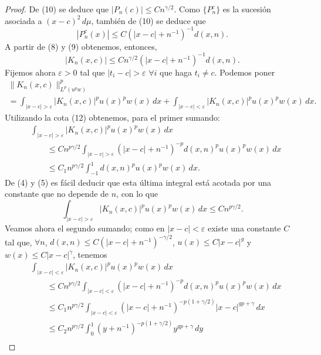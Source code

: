 \documentclass[a4paper,12pt]{article}
\theoremstyle{plain}
\theoremstyle{definition}
\begin{document}
\begin{proof}
De (10) se deduce que $| P_{n}(c) | \leq C n^{\gamma/2}$.
Como $\{P_{n}^{c}\}$ es la sucesi\'on
asociada a $(x-c)^{2}\,d\mu$, tambi\'{e}n de (10) se deduce que
$$
| P_{n}^{c}(x) | \leq C ( | x - c | + n^{-1})^{-1} d(x,n).
$$
A partir de (8) y (9) obtenemos, entonces,
\begin{equation}
| K_{n}(x,c) | \leq C n^{\gamma/2} ( | x - c | + n^{-1})^{-1} d(x,n).
\tag{12}
\end{equation}
Fijemos ahora $\varepsilon > 0$ tal que $| t_{i} - c | > \varepsilon$
$\forall i$ que haga $t_{i} \neq c$.
Podemos poner
\begin{multline*}
\| K_{n}(x,c) \|^{p}_{L^{p}(u^{p}w)} \\
= \int_{| x - c | > \varepsilon} | K_{n}(x,c) |^{p} u(x)^{p} w(x)\,dx
+ \int_{| x - c | < \varepsilon} | K_{n}(x,c) |^{p} u(x)^{p} w(x)\,dx.
\end{multline*}
Utilizando la cota (12) obtenemos, para el primer sumando:
\begin{align*}
&\int_{| x - c | > \varepsilon} | K_{n}(x,c) |^{p} u(x)^{p} w(x)\,dx \\
&\qquad\leq C n^{p \gamma/2} \int_{| x - c | > \varepsilon}
( | x - c | + n^{-1})^{-p} d(x,n)^{p} u(x)^{p} w(x)\,dx \\
&\qquad\leq C_{1} n^{p \gamma/2} \int_{-1}^{1} d(x,n)^{p} u(x)^{p} w(x)\,dx.
\end{align*}
De (4) y (5) es f\'acil deducir que esta \'ultima integral est\'a
acotada por una constante que no depende de $n$, con lo que
\begin{equation}
\int_{| x - c | > \varepsilon} | K_{n}(x,c) |^{p} u(x)^{p} w(x)\,dx
\leq C n^{p\gamma/2}.
\tag{13}
\end{equation}
Veamos ahora el segundo sumando; como en $| x - c | < \varepsilon$
existe una constante $C$ tal que, $\forall n$,
$d(x,n) \leq C ( | x - c | + n^{-1})^{-\gamma/2}$,
$u(x) \leq C | x - c |^{g}$
y $w(x) \leq C | x - c |^{\gamma}$, tenemos
\begin{align*}
&\int_{| x - c | < \varepsilon} | K_{n}(x,c) |^{p} u(x)^{p} w(x)\,dx \\
&\qquad\leq C n^{p\gamma/2} \int_{| x - c | < \varepsilon} ( | x - c | + n^{-1})^{-p}
d(x,n)^{p} u(x)^{p} w(x)\,dx \\
&\qquad\leq C_{1} n^{p \gamma/2}
\int_{| x - c | < \varepsilon} ( | x - c | + n^{-1})^{-p(1+\gamma/2)}
| x - c |^{gp+\gamma} \,dx \\
&\qquad\leq C _{2} n^{p\gamma/2}
\int_{0}^{1} (y + n^{-1})^{-p(1+\gamma/2)} y^{gp+\gamma} \,dy \\

\end{align*}
\end{proof}
\end{document}
